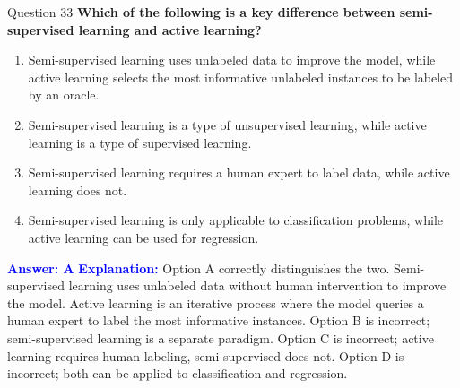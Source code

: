 \documentclass{beamer}
\begin{document}
	\begin{frame}{Question 33}
		\textbf{Which of the following is a key difference between semi-supervised learning and active learning?}
		\begin{enumerate}
			\item Semi-supervised learning uses unlabeled data to improve the model, while active learning selects the most informative unlabeled instances to be labeled by an oracle.
			\item Semi-supervised learning is a type of unsupervised learning, while active learning is a type of supervised learning.
			\item Semi-supervised learning requires a human expert to label data, while active learning does not.
			\item Semi-supervised learning is only applicable to classification problems, while active learning can be used for regression.
		\end{enumerate}
		\vspace{0.2cm}
		\textcolor{blue}{\textbf{Answer: A}}
		\vspace{0.2cm}
		\textcolor{blue}{\textbf{Explanation:}} Option A correctly distinguishes the two. Semi-supervised learning uses unlabeled data without human intervention to improve the model. Active learning is an iterative process where the model queries a human expert to label the most informative instances. Option B is incorrect; semi-supervised learning is a separate paradigm. Option C is incorrect; active learning requires human labeling, semi-supervised does not. Option D is incorrect; both can be applied to classification and regression.
	\end{frame}
	
\end{document}
